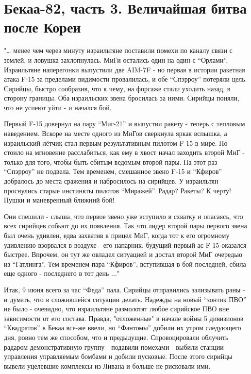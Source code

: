 \chapter {Бекаа-82, часть 3. Величайшая битва после Кореи}
\begin{remark}
"… менее чем через минуту израильтяне поставили помехи по каналу связи с землей, и ловушка захлопнулась. МиГи остались один на один с “Орлами”.
Израильтяне наперегонки выпустили две AIM-7F - но первая в истории ракетная атака F-15 за пределами видимости провалилась, и обе “Спэрроу” потеряли цель. Сирийцы, быстро сообразив, что к чему, на форсаже стали уходить назад, в сторону границы. Оба израильских звена бросилась за ними. Сирийцы поняли, что не успеют уйти - и начался бой.

Первый F-15 довернул на пару “Миг-21” и выпустил ракету - теперь с тепловым наведением. Вскоре на месте одного из МиГов сверкнула яркая вспышка, а израильский лётчик стал первым результативным пилотом F-15 в мире. Но стоило на мгновение расслабиться, как ему в хвост начал заходить второй МиГ - только для того, чтобы быть сбитым ведомым второй пары. На этот раз “Спэрроу” не подвела. Тем временем, смешанное звено F-15 и “Кфиров” добралось до места сражения и набросилось на сирийцев. У израильтян проснулись старые инстинкты пилотов “Миражей”. Радар? Ракеты? К черту! Пушки и маневренный ближний бой!

Они спешили - слыша, что первое звено уже вступило в схватку и опасаясь, что всех сирийцев собьют до их появления. Так что лидер второй пары первого звена был очень удивлен, едва захватив в прицел МиГ, когда тот к его огромному удивлению взорвался в воздухе - его напарник, будущий первый ас F-15 оказался быстрее. Впрочем, он тут же овладел ситуацией и достал второй МиГ очередью из “Гатлинга”. Тем временем пара “Кфиров”, вступившая в бой последней, сбила еще одного - последнего в тот день ..."	
\end{remark}

Итак, 9 июня всего за час “Феда” пала. Сирийцы отправились зализывать раны - и думать, что в сложившейся ситуации делать. Надежды на новый “зонтик ПВО” не было - очевидно, что израильтяне размолотят любое сирийское ПВО вне зависимости от его состава. Правда, "отложенные" в начале войны 5 дивизионов “Квадратов” в Бекаа все-же ввели, но “Фантомы” добили их утром следующего дня, ровно тем же способом, что и предыдущие. Спровоцировали облучить радаром демонстративную группу - подавили помехами - выбили станции управления управляемым бомбами и добили пусковые. После этого сирийцы вывели уцелевшие комплексы из Ливана и больше не рисковали ими.

